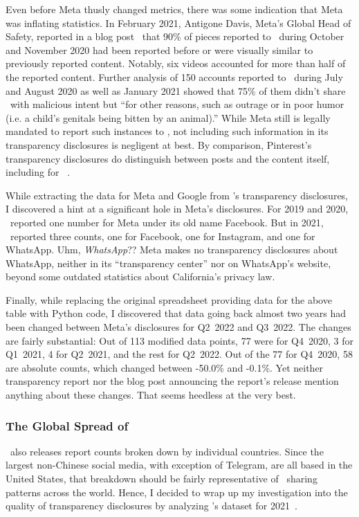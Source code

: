 Even before Meta thusly changed metrics, there was some indication that Meta was
inflating statistics. In February 2021, Antigone Davis, Meta's Global Head of
Safety, reported in a blog post~\cite{Davis2021} that 90\% of pieces reported to
\NCMEC\ during October and November 2020 had been reported before or were
visually similar to previously reported content. Notably, six videos accounted
for more than half of the reported content. Further analysis of 150 accounts
reported to \NCMEC\ during July and August 2020 as well as January 2021 showed
that 75\% of them didn't share \CSAM\ with malicious intent but ``for other
reasons, such as outrage or in poor humor (i.e. a child's genitals being bitten
by an animal).'' While Meta still is legally mandated to report such instances
to \NCMEC, not including such information in its transparency disclosures is
negligent at best. By comparison, Pinterest's transparency disclosures do
distinguish between posts and the content itself, including for
\CSAM~\cite{Pinterest2022}.

While extracting the data for Meta and Google from \NCMEC's transparency
disclosures, I discovered a hint at a significant hole in Meta's disclosures.
For 2019 and 2020, \NCMEC\ reported one number for Meta under its old name
Facebook. But in 2021, \NCMEC\ reported three counts, one for Facebook, one for
Instagram, and one for WhatsApp. Uhm, \emph{WhatsApp}?? Meta makes no
transparency disclosures about WhatsApp, neither in its ``transparency center''
nor on WhatsApp's website, beyond some outdated statistics about California's
privacy law.

Finally, while replacing the original spreadsheet providing data for the above
table with Python code, I discovered that data going back almost two years had
been changed between Meta's disclosures for Q2~2022 and Q3~2022. The changes are
fairly substantial: Out of 113 modified data points, 77 were for Q4~2020, 3 for
Q1~2021, 4 for Q2~2021, and the rest for Q2~2022. Out of the 77 for Q4~2020, 58
are absolute counts, which changed between -50.0\% and -0.1\%. Yet neither
transparency report nor the blog post announcing the report's release mention
anything about these changes. That seems heedless at the very best.


\subsubsection{The Global Spread of \CSAM}

\NCMEC\ also releases report counts broken down by individual countries. Since
the largest non-Chinese social media, with exception of Telegram, are all based
in the United States, that breakdown should be fairly representative of \CSAM\
sharing patterns across the world. Hence, I decided to wrap up my investigation
into the quality of transparency disclosures by analyzing \NCMEC's dataset for
2021~\cite{NcmecByCountry2021}.

